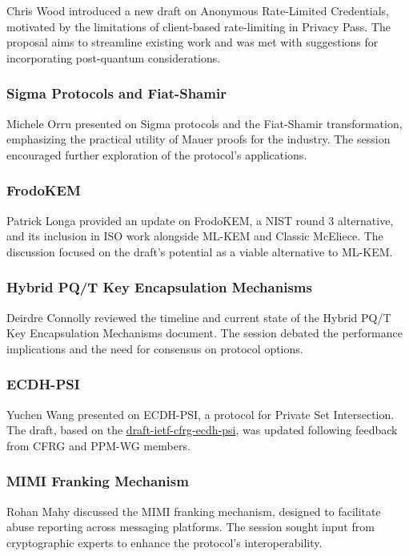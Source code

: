 \documentclass{article}
\begin{document}
Chris Wood introduced a new draft on Anonymous Rate-Limited Credentials, motivated by the limitations of client-based rate-limiting in Privacy Pass. The proposal aims to streamline existing work and was met with suggestions for incorporating post-quantum considerations.

\subsubsection{Sigma Protocols and Fiat-Shamir}

Michele Orru presented on Sigma protocols and the Fiat-Shamir transformation, emphasizing the practical utility of Mauer proofs for the industry. The session encouraged further exploration of the protocol's applications.

\subsubsection{FrodoKEM}

Patrick Longa provided an update on FrodoKEM, a NIST round 3 alternative, and its inclusion in ISO work alongside ML-KEM and Classic McEliece. The discussion focused on the draft's potential as a viable alternative to ML-KEM.

\subsubsection{Hybrid PQ/T Key Encapsulation Mechanisms}

Deirdre Connolly reviewed the timeline and current state of the Hybrid PQ/T Key Encapsulation Mechanisms document. The session debated the performance implications and the need for consensus on protocol options.

\subsubsection{ECDH-PSI}

Yuchen Wang presented on ECDH-PSI, a protocol for Private Set Intersection. The draft, based on the \href{https://datatracker.ietf.org/doc/html/draft-ietf-cfrg-ecdh-psi}{draft-ietf-cfrg-ecdh-psi}, was updated following feedback from CFRG and PPM-WG members.

\subsubsection{MIMI Franking Mechanism}

Rohan Mahy discussed the MIMI franking mechanism, designed to facilitate abuse reporting across messaging platforms. The session sought input from cryptographic experts to enhance the protocol's interoperability.
\end{document}
